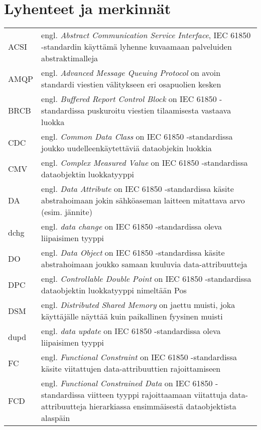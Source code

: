 \chapter*{Lyhenteet ja merkinnät}
\label{ch:lyhenteetjamerkinnat}
\begin{tabularx}{\linewidth}[h]{@{} p{} p{} @{}}
	ACSI & engl. \emph{Abstract Communication Service Interface}, IEC 61850 -standardin käyttämä lyhenne kuvaamaan palveluiden abstraktimalleja \\
	AMQP & engl. \emph{Advanced Message Queuing Protocol} on avoin standardi viestien välitykseen eri osapuolien kesken \\
	BRCB & engl. \emph{Buffered Report Control Block} on IEC 61850 -standardissa puskuroitu viestien tilaamisesta vastaava luokka \\
	CDC & engl. \emph{Common Data Class} on IEC 61850 -standardissa joukko uudelleenkäytettäviä dataobjekin luokkia \\
	CMV & engl. \emph{Complex Measured Value} on IEC 61850 -standardissa dataobjektin luokkatyyppi \\
	DA & engl. \emph{Data Attribute} on IEC 61850 -standardissa käsite abstrahoimaan jokin sähköaseman laitteen mitattava arvo (esim. jännite) \\
	dchg & engl. \emph{data change} on IEC 61850 -standardissa oleva liipaisimen tyyppi \\
	DO & engl. \emph{Data Object} on IEC 61850 -standardissa käsite abstrahoimaan joukko samaan kuuluvia data-attribuutteja \\
	DPC & engl. \emph{Controllable Double Point} on IEC 61850 -standardissa dataobjektin luokkatyyppi nimeltään Pos \\
	DSM & engl. \emph{Distributed Shared Memory} on jaettu muisti, joka käyttäjälle näyttää kuin paikallinen fyysinen muisti \\
	dupd & engl. \emph{data update} on IEC 61850 -standardissa oleva liipaisimen tyyppi \\
	FC & engl. \emph{Functional Constraint} on IEC 61850 -standardissa käsite viitattujen data-attribuuttien rajoittamiseen \\
	FCD & engl. \emph{Functional Constrained Data} on IEC 61850 -standardissa viitteen tyyppi rajoittaamaan viitattuja data-attribuutteja hierarkiassa ensimmäisestä dataobjektista alaspäin \\

\end{tabularx}
